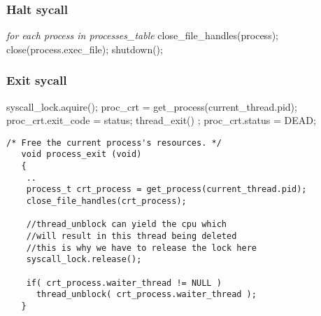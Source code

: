     \subsubsection{Halt sycall}
    \vspace{-3em} %
      \begin{program}
	\textit{for each process in processes\_table}
	\hspace{30pt}close\_file\_handles(process);
	\hspace{30pt}close(process.exec\_file);
	shutdown();
      \end{program}


    \subsubsection{Exit sycall}
    \vspace{-3em} %
      \begin{program}
	syscall\_lock.aquire();
	proc\_crt = get\_process(current\_thread.pid);
	proc\_crt.exit\_code = status;
	thread\_exit() ;
	proc\_crt.status = DEAD;
      \end{program}
    \begin{lstlisting}
/* Free the current process's resources. */	
   void process_exit (void)
   {
    ..
    process_t crt_process = get_process(current_thread.pid);
    close_file_handles(crt_process);
    
    //thread_unblock can yield the cpu which
    //will result in this thread being deleted
    //this is why we have to release the lock here
    syscall_lock.release();
    
    if( crt_process.waiter_thread != NULL ) 
      thread_unblock( crt_process.waiter_thread );
   }
    \end{lstlisting}

    \newpage

